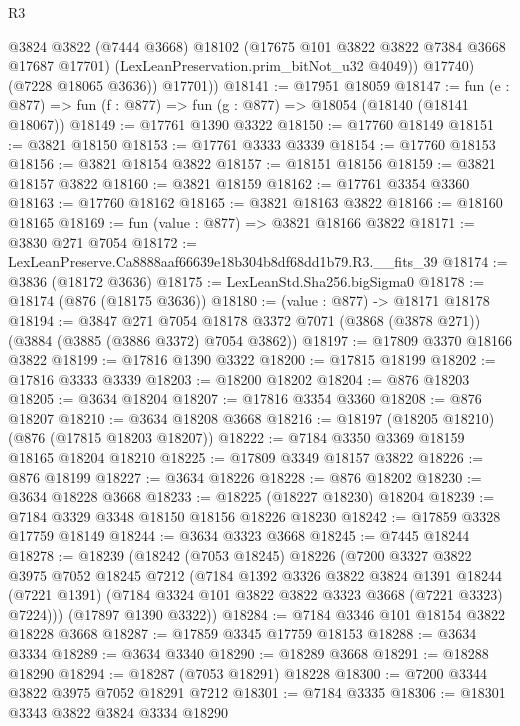 \begin{lexlean}{R3}
\begin{coremodule}
              @3824
              @3822
              (@7444 @3668)
              @18102
              (@17675 @101 @3822 @3822 @7384 @3668 @17687 @17701)
              (LexLeanPreservation.prim_bitNot_u32 @4049))
            @17740)
          (@7228 @18065 @3636))
        @17701))
@18141 := @17951 @18059
@18147 := fun (e : @877) => fun (f : @877) => fun (g : @877) => @18054 (@18140 (@18141 @18067))
@18149 := @17761 @1390 @3322
@18150 := @17760 @18149
@18151 := @3821 @18150
@18153 := @17761 @3333 @3339
@18154 := @17760 @18153
@18156 := @3821 @18154 @3822
@18157 := @18151 @18156
@18159 := @3821 @18157 @3822
@18160 := @3821 @18159
@18162 := @17761 @3354 @3360
@18163 := @17760 @18162
@18165 := @3821 @18163 @3822
@18166 := @18160 @18165
@18169 := fun (value : @877) => @3821 @18166 @3822
@18171 := @3830 @271 @7054
@18172 := LexLeanPreserve.Ca8888aaf66639e18b304b8df68dd1b79.R3.__fits_39
@18174 := @3836 (@18172 @3636)
@18175 := LexLeanStd.Sha256.bigSigma0
@18178 := @18174 (@876 (@18175 @3636))
@18180 := (value : @877) -> @18171 @18178
@18194 := @3847
    @271
    @7054
    @18178
    @3372
    @7071
    (@3868 (@3878 @271))
    (@3884 (@3885 (@3886 @3372) @7054 @3862))
@18197 := @17809 @3370 @18166 @3822
@18199 := @17816 @1390 @3322
@18200 := @17815 @18199
@18202 := @17816 @3333 @3339
@18203 := @18200 @18202
@18204 := @876 @18203
@18205 := @3634 @18204
@18207 := @17816 @3354 @3360
@18208 := @876 @18207
@18210 := @3634 @18208 @3668
@18216 := @18197 (@18205 @18210) (@876 (@17815 @18203 @18207))
@18222 := @7184 @3350 @3369 @18159 @18165 @18204 @18210
@18225 := @17809 @3349 @18157 @3822
@18226 := @876 @18199
@18227 := @3634 @18226
@18228 := @876 @18202
@18230 := @3634 @18228 @3668
@18233 := @18225 (@18227 @18230) @18204
@18239 := @7184 @3329 @3348 @18150 @18156 @18226 @18230
@18242 := @17859 @3328 @17759 @18149
@18244 := @3634 @3323 @3668
@18245 := @7445 @18244
@18278 := @18239
    (@18242
      (@7053 @18245)
      @18226
      (@7200
        @3327
        @3822
        @3975
        @7052
        @18245
        @7212
        (@7184
          @1392
          @3326
          @3822
          @3824
          @1391
          @18244
          (@7221 @1391)
          (@7184 @3324 @101 @3822 @3822 @3323 @3668 (@7221 @3323) @7224)))
      (@17897 @1390 @3322))
@18284 := @7184 @3346 @101 @18154 @3822 @18228 @3668
@18287 := @17859 @3345 @17759 @18153
@18288 := @3634 @3334
@18289 := @3634 @3340
@18290 := @18289 @3668
@18291 := @18288 @18290
@18294 := @18287 (@7053 @18291) @18228
@18300 := @7200 @3344 @3822 @3975 @7052 @18291 @7212
@18301 := @7184 @3335
@18306 := @18301 @3343 @3822 @3824 @3334 @18290

\end{coremodule}
\end{lexlean}
